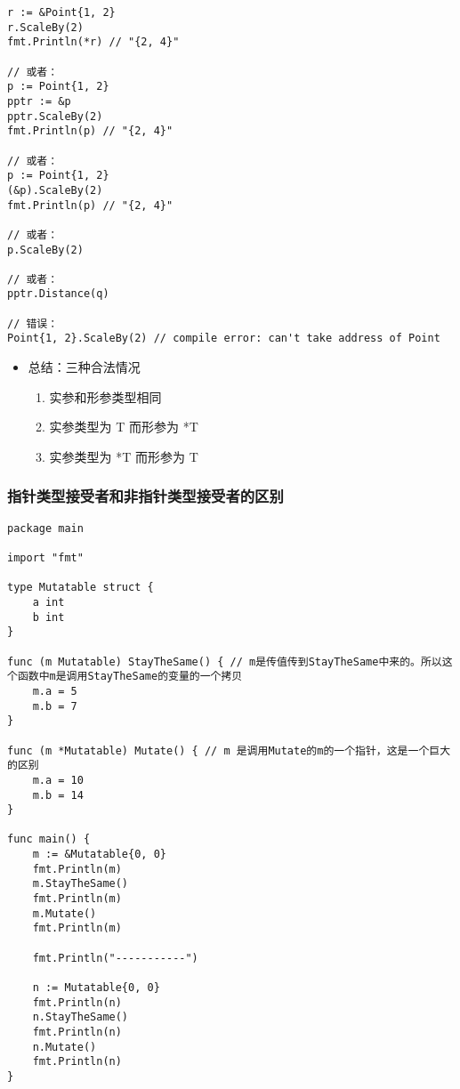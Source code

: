 \begin{verbatim}
r := &Point{1, 2}
r.ScaleBy(2)
fmt.Println(*r) // "{2, 4}"

// 或者：
p := Point{1, 2}
pptr := &p
pptr.ScaleBy(2)
fmt.Println(p) // "{2, 4}"

// 或者：
p := Point{1, 2}
(&p).ScaleBy(2)
fmt.Println(p) // "{2, 4}"

// 或者：
p.ScaleBy(2)

// 或者：
pptr.Distance(q)

// 错误：
Point{1, 2}.ScaleBy(2) // compile error: can't take address of Point
\end{verbatim}

\begin{itemize}
\tightlist
\item
  总结：三种合法情况

  \begin{enumerate}
  \def\labelenumi{\arabic{enumi}.}
  \tightlist
  \item
    实参和形参类型相同
  \item
    实参类型为 T 而形参为 *T
  \item
    实参类型为 *T 而形参为 T
  \end{enumerate}
\end{itemize}

\hypertarget{ux6307ux9488ux7c7bux578bux63a5ux53d7ux8005ux548cux975eux6307ux9488ux7c7bux578bux63a5ux53d7ux8005ux7684ux533aux522b}{%
\subsubsection{指针类型接受者和非指针类型接受者的区别}\label{ux6307ux9488ux7c7bux578bux63a5ux53d7ux8005ux548cux975eux6307ux9488ux7c7bux578bux63a5ux53d7ux8005ux7684ux533aux522b}}

\begin{verbatim}
package main

import "fmt"

type Mutatable struct {
    a int
    b int
}

func (m Mutatable) StayTheSame() { // m是传值传到StayTheSame中来的。所以这个函数中m是调用StayTheSame的变量的一个拷贝
    m.a = 5
    m.b = 7
}

func (m *Mutatable) Mutate() { // m 是调用Mutate的m的一个指针，这是一个巨大的区别
    m.a = 10
    m.b = 14
}

func main() {
    m := &Mutatable{0, 0}
    fmt.Println(m)
    m.StayTheSame()
    fmt.Println(m)
    m.Mutate()
    fmt.Println(m)

    fmt.Println("-----------")

    n := Mutatable{0, 0}
    fmt.Println(n)
    n.StayTheSame()
    fmt.Println(n)
    n.Mutate()
    fmt.Println(n)
}
\end{verbatim}

